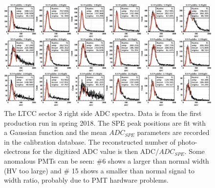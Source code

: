 \begin{figure}
	\centering
	\includegraphics[width=2.1\columnwidth,keepaspectratio]{img/spe.png}
	\caption{The LTCC sector 3 right side ADC spectra. Data is from the first production run in spring 2018.
          The SPE peak positions are fit with a Gaussian function and the mean $ADC_{SPE}$ parameters are recorded
          in the calibration database. The reconstructed number of photo-electrons for the digitized ADC value is
          then ADC/$ADC_{SPE}$. Some anomalous PMTs can be seen: \#6 shows a larger than normal width (HV too large)
          and \# 15 shows a smaller than normal signal to width ratio, probably due to PMT hardware problems.}
	\label{fig:speCalibration}
\end{figure}
